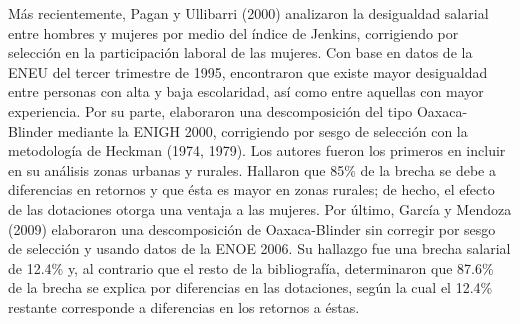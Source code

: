 M\'as recientemente, Pagan y Ullibarri (2000) analizaron la desigualdad salarial entre hombres y mujeres por medio del \'indice de Jenkins, corrigiendo por selecci\'on en la participaci\'on laboral de las mujeres. Con base en datos de la ENEU del tercer trimestre de 1995, encontraron que existe mayor desigualdad entre personas con alta y baja escolaridad, as\'i como entre aquellas con mayor experiencia. Por su parte, elaboraron una descomposici\'on del tipo Oaxaca-Blinder mediante la ENIGH 2000, corrigiendo por sesgo de selecci\'on con la metodolog\'ia de Heckman (1974, 1979). Los autores fueron los primeros en incluir en su an\'alisis zonas urbanas y rurales. Hallaron que 85\% de la brecha se debe a diferencias en retornos y que \'esta es mayor en zonas rurales; de hecho, el efecto de las dotaciones otorga una ventaja a las mujeres. Por \'ultimo, Garc\'ia y Mendoza (2009) elaboraron una descomposici\'on de Oaxaca-Blinder sin corregir por sesgo de selecci\'on y usando datos de la ENOE 2006. Su hallazgo fue una brecha salarial de 12.4\% y, al contrario que el resto de la bibliograf\'ia, determinaron que 87.6\% de la brecha se explica por diferencias en las dotaciones, seg\'un la cual el 12.4\% restante corresponde a diferencias en los retornos a \'estas.

